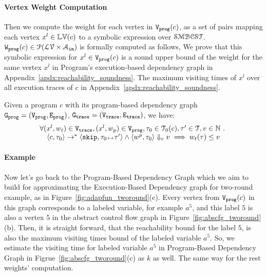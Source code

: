 \paragraph{Vertex Weight Computation}
Then we compute the weight for each vertex in $\mathtt{{V_{prog}}}(c)$,
as a set of pairs 
mapping each vertex $x^l \in \mathbb{LV}(c)$ to a symbolic expression over $\mathcal{SMBCST}$.
$\mathtt{{W_{prog}}}(c) \in \mathcal{P}(\mathcal{LV} \times \mathcal{A}_{\mathtt{in}})$ is formally computed
as follows,
%
We prove that this 
symbolic expression for $x^l \in \mathtt{{V_{prog}}}(c)$ is a sound upper bound of 
the weight for the same vertex $x^l$ in Program's execution-based dependency graph in Appendix~\ref{apdx:reachability_soundness}.
The maximum visiting times of $x^l$ over all execution traces of $c$ in Appendix~\ref{apdx:reachability_soundness}. 
%
\begin{thm}
  \label{thm:vertexweight_soundness}
Given a program ${c}$ with its program-based dependency graph 
$\mathtt{{G_{prog}}} = (\mathtt{{V_{prog}}}, \mathtt{{E_{prog}}})$,
$\mathtt{{G_{trace}}} = (\mathtt{{V_{trace}}}, \mathtt{{E_{trace}}})$, we have:
%
\[
  \begin{array}{l}
  \forall (x^l, w_{t}) \in \mathtt{{V_{trace}}},
  (x^l, w_{p}) \in \mathtt{{V_{prog}}}, 
  \mathtt{\tau}_0 \in \mathcal{T}_0(c), 
  \mathtt{\tau}' \in \mathcal{T}, v \in \mathbb{N} ~.~
  \\ \quad
  \langle {c}, \mathtt{\tau}_0 \rangle \to^{*} \langle \mathtt{skip}, \mathtt{\tau}_0{\scriptscriptstyle ++}\mathtt{\tau}' \rangle 
  \land 
  \langle w^{p}, \mathtt{\tau}_0 \rangle \Downarrow_e v
  \implies
  w_{t}(\mathtt{\tau}) \leq v
  \end{array}
\]
\end{thm}
\paragraph*{Example}
Now let's 
go back to the Program-Based Dependency Graph which we aim to build for approximating the 
Execution-Based Dependency graph for two-round example, as in
Figure~\ref{fig:adapfun_tworound}(c).
%
Every vertex from $\mathtt{{V_{prog}}}(c)$ in this graph corresponds to a labeled variable, for example $a^5$,
and this label $5$ is also a vertex $5$ in the abstract control flow graph in Figure~\ref{fig:abscfg_tworound}(b).
%
Then, it is straight forward, 
that the reachability bound for the label $5$, 
is also the maximum visiting times bound of the labeled variable $a^5$.
So, we estimate the visiting time for  labeled variable $a^5$ in Program-Based Dependency Graph in Figrue~\ref{fig:abscfg_tworound}(c) as $k$ as well.
%
The same way for the rest weights' computation.
%
